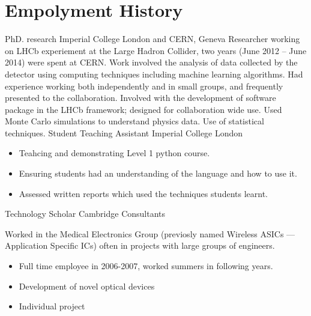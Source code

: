 \section{Empolyment History}
{PhD. research}
{Imperial College London and CERN, Geneva}
{}{}
{
  Researcher working on LHCb experiement at the Large Hadron Collider, two years (June 2012 -- June
  2014) were spent at CERN.
  Work involved the analysis of data collected by the detector using computing techniques including
  machine learning algorithms.
  Had experience working both independently and in small groups, and frequently presented to the
  collaboration.
  Involved with the development of software package in the LHCb framework; designed for
  collaboration wide use.
  Used Monte Carlo simulations to understand physics data.
  Use of statistical techniques.
}
{Student Teaching Assistant}
{Imperial College London}
{}{}
{
  \begin{itemize}
    \item Teahcing and demonstrating Level 1 python course.
    \item Ensuring students had an understanding of the language and how to use it.
    \item Assessed written reports which used the techniques students learnt.
  \end{itemize}
}
{Technology Scholar}
{Cambridge Consultants}
{}{}
{
  Worked in the Medical Electronics Group (previosly named Wireless ASICs --- Application Specific
  ICs) often in projects with large groups of engineers.
  \begin{itemize}
    \item Full time employee in 2006-2007, worked summers in following years.
    \item Development of novel optical devices
    \item Individual project
  \end{itemize}
}



